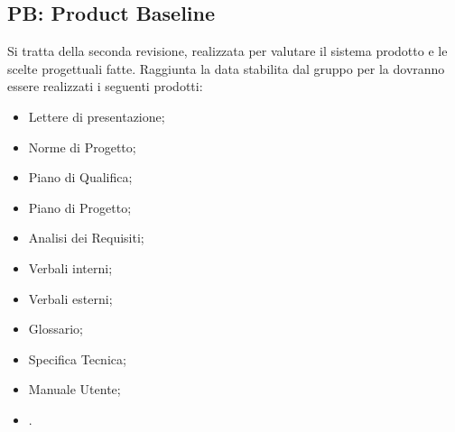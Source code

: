 \subsection{PB: Product Baseline}
\label{sec:PB}
Si tratta della seconda revisione, realizzata per valutare il sistema prodotto e le scelte progettuali fatte.
Raggiunta la data stabilita dal gruppo per la  dovranno essere realizzati i seguenti prodotti:
\begin{itemize}
    \item Lettere di presentazione;
    \item Norme di Progetto;
    \item Piano di Qualifica;
    \item Piano di Progetto;
    \item Analisi dei Requisiti;
    \item Verbali interni;
    \item Verbali esterni;
    \item Glossario;
    \item Specifica Tecnica;
    \item Manuale Utente;
    \item {}.
\end{itemize}

